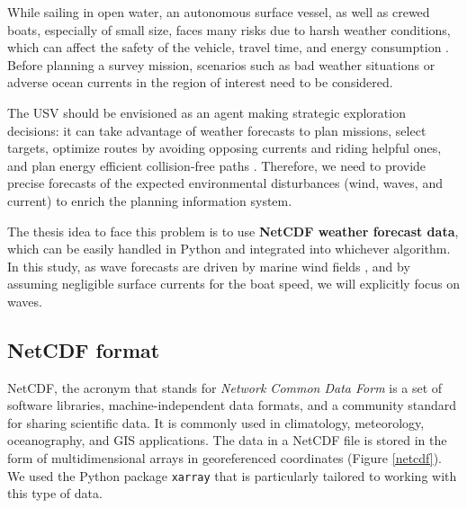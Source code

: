 While sailing in open water, an autonomous surface vessel, as well as crewed boats, especially of small size, faces many risks due to harsh weather conditions, which can affect the safety of the vehicle, travel time, and energy consumption \cite{vagale2021path}.
Before planning a survey mission, scenarios such as bad weather situations or adverse ocean currents in the region of interest need to be considered.  

The USV should be envisioned as an agent making strategic exploration decisions: it can take advantage of weather forecasts to plan missions, select targets, optimize routes by avoiding opposing currents and riding helpful ones, and plan energy efficient collision-free paths \cite{krell2020autonomous}. Therefore, we need to provide precise forecasts of the expected environmental disturbances (wind, waves, and current) to enrich the planning information system. 

The thesis idea to face this problem is to use \textbf{NetCDF weather forecast data}, which can be easily handled in Python and integrated into whichever algorithm. In this study, as wave forecasts are driven by marine wind fields \cite{NICLASEN20101, XIE2015287}, and by assuming negligible surface currents for the boat speed, we will explicitly focus on waves.    
\newpage
\subsection{NetCDF format}
NetCDF, the acronym that stands for \textit{Network Common Data Form} is a set of software libraries, machine-independent data formats, and a community standard for sharing scientific data. It is commonly used in climatology, meteorology, oceanography, and GIS applications. The data in a NetCDF file is stored in the form of multidimensional arrays in georeferenced coordinates \cite{unicar} (Figure \ref{netcdf}). \\
We used the Python package \texttt{xarray} that is particularly tailored to working with this type of data.

